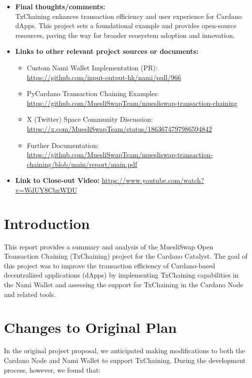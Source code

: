 \documentclass[11pt]{article}
\begin{document}
\begin{itemize}
    \item \textbf{Final thoughts/comments:}\\
    TxChaining enhances transaction efficiency and user experience for Cardano dApps. This project sets a foundational example and provides open-source resources, paving the way for broader ecosystem adoption and innovation.

    \item \textbf{Links to other relevant project sources or documents:}
    \begin{itemize}
        \item Custom Nami Wallet Implementation (PR):\\
        \url{https://github.com/input-output-hk/nami/pull/966}
        \item PyCardano Transaction Chaining Examples:\\
        \url{https://github.com/MuesliSwapTeam/muesliswap-transaction-chaining}
        \item X (Twitter) Space Community Discussion:\\
        \url{https://x.com/MuesliSwapTeam/status/1863674797986594842}
        \item Further Documentation:\\
        \url{https://github.com/MuesliSwapTeam/muesliswap-transaction-chaining/blob/main/report/main.pdf}
    \end{itemize}

    \item \textbf{Link to Close-out Video:} \url{https://www.youtube.com/watch?v=WdUY8CbxWDU}
\end{itemize}


\section{Introduction}
This report provides a summary and analysis of the MuesliSwap Open Transaction Chaining (TxChaining) project for the Cardano Catalyst. The goal of this project was to improve the transaction efficiency of Cardano-based decentralized applications (dApps) by implementing TxChaining capabilities in the Nami Wallet and assessing the support for TxChaining in the Cardano Node and related tools.

\section{Changes to Original Plan}
In the original project proposal, we anticipated making modifications to both the Cardano Node and Nami Wallet to support TxChaining. During the development process, however, we found that:
\end{document}
